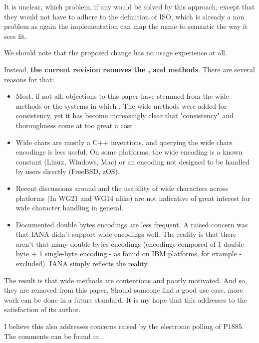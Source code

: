 \documentclass{wg21}
\begin{document}
It is unclear, which problem, if any would be solved by this approach, except that they would not have to adhere to the definition of ISO, which is already a non problem as again the implementation can map the name to semantic the way it sees fit.

We should note that the proposed change has no usage experience at all.

Instead, \textbf{the current revision removes the ,  and  methods}.
There are several reasons for that:
\begin{itemize}
    \item Most, if not all, objections to this paper have stemmed from the wide methods or the systems in which . The wide methods were added for consistency, yet it has become increasingly clear that "consistency" and thoroughness come at too great a cost
    \item Wide chars are mostly a C++ inventions, and querying the wide chars encodings is less useful. On some platforms, the wide encoding is a known constant (Linux, Windows, Mac) or an encoding not designed to be handled by users directly (FreeBSD, zOS).
    \item Recent discussions around  and the usability of wide characters across platforms (In WG21 and WG14 alike) are not indicative of great interest for wide character handling in general.
    \item Documented double bytes encodings are less frequent. A raised concern was that IANA didn't support wide encodings well. The reality is that there aren't that many double bytes encodings (encodings composed of 1 double-byte + 1 single-byte encoding - as found on IBM platforms, for example - excluded). IANA simply reflects the reality.
\end{itemize}

The result is that wide methods are contentious and poorly motivated. And so, they are removed from this paper.
Should someone find a good use case, more work can be done in a future standard.
It is my hope that this addresses  to the satisfaction of its author.

I believe this also addresses concerns raised by the electronic polling of P1885. The comments can be found in .
\end{document}
